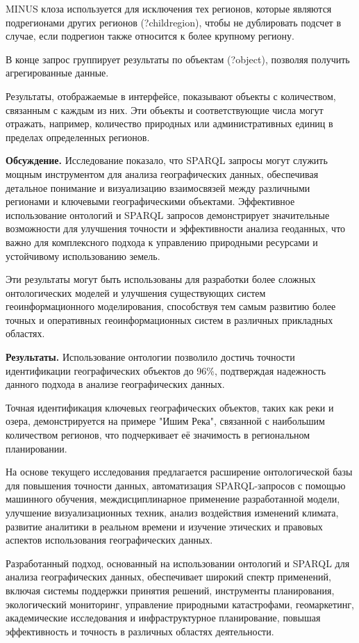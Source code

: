 MINUS клоза используется для исключения тех регионов, которые являются
подрегионами других регионов (?childregion), чтобы не дублировать
подсчет в случае, если подрегион также относится к более крупному
региону.

В конце запрос группирует результаты по объектам (?object), позволяя
получить агрегированные данные.

Результаты, отображаемые в интерфейсе, показывают объекты с количеством,
связанным с каждым из них. Эти объекты и соответствующие числа могут
отражать, например, количество природных или административных единиц в
пределах определенных регионов.

\textbf{Обсуждение.} Исследование показало, что SPARQL запросы могут
служить мощным инструментом для анализа географических данных,
обеспечивая детальное понимание и визуализацию взаимосвязей между
различными регионами и ключевыми географическими объектами. Эффективное
использование онтологий и SPARQL запросов демонстрирует значительные
возможности для улучшения точности и эффективности анализа геоданных,
что важно для комплексного подхода к управлению природными ресурсами и
устойчивому использованию земель.

Эти результаты могут быть использованы для разработки более сложных
онтологических моделей и улучшения существующих систем
геоинформационного моделирования, способствуя тем самым развитию более
точных и оперативных геоинформационных систем в различных прикладных
областях.

\textbf{Результаты.} Использование онтологии позволило достичь точности
идентификации географических объектов до 96\%, подтверждая надежность
данного подхода в анализе географических данных.

Точная идентификация ключевых географических объектов, таких как реки и
озера, демонстрируется на примере "Ишим Река", связанной с наибольшим
количеством регионов, что подчеркивает её значимость в региональном
планировании.

На основе текущего исследования предлагается расширение онтологической
базы для повышения точности данных, автоматизация SPARQL-запросов с
помощью машинного обучения, междисциплинарное применение разработанной
модели, улучшение визуализационных техник, анализ воздействия изменений
климата, развитие аналитики в реальном времени и изучение этических и
правовых аспектов использования географических данных.

Разработанный подход, основанный на использовании онтологий и SPARQL для
анализа географических данных, обеспечивает широкий спектр применений,
включая системы поддержки принятия решений, инструменты планирования,
экологический мониторинг, управление природными катастрофами,
геомаркетинг, академические исследования и инфраструктурное
планирование, повышая эффективность и точность в различных областях
деятельности.


